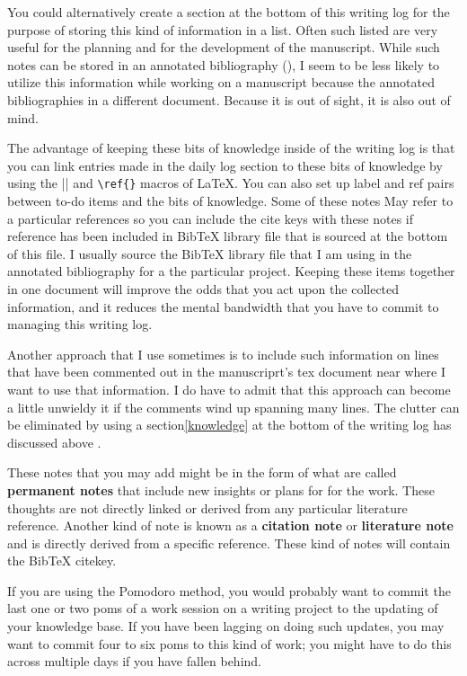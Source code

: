 \documentclass[10pt,letterpaper]{article}
\begin{document}
You could alternatively create a section at the bottom of this writing log for the purpose of storing this kind of information in a list.
Often such listed are very useful for the planning and for the development of the manuscript.
While such notes can be stored in an annotated bibliography (), I seem to be less likely to utilize this information while working on a manuscript because the annotated bibliographies in a different document.
Because it is out of sight, it is also out of mind.

The advantage of keeping these bits of knowledge inside of the writing log is that you can link entries made in the daily log section to these bits of knowledge by using the \verb||\label{}|| and \verb|\ref{}| macros of LaTeX.
You can also set up label and ref pairs between to-do items and the bits of knowledge.
Some of these notes May refer to a particular references so you can include the cite keys with these notes if reference has been included in BibTeX library file that is sourced at the bottom of this file.
I usually source the BibTeX library file that I am using in the annotated bibliography for a the particular project.
Keeping these items together in one document will improve the odds that you act upon the collected information, and it reduces the mental bandwidth that you have to commit to managing this writing log.

Another approach that I use sometimes is to include such information on lines that have been commented out in the manuscriprt's tex document near where I want to use that information.
I do have to admit that this approach can become a little unwieldy it if the comments wind up spanning many lines.
The clutter can be eliminated by using a section\ref{knowledge} at the bottom of the writing log has discussed above .

These notes that you may add might be in the form of what are called \textbf{permanent notes} that include new insights or plans for for the work.
These thoughts are not directly linked or derived from any particular literature reference.
Another kind of note is known as a \textbf{citation note} or \textbf{literature note} and is directly derived from a specific reference.
These kind of notes will contain the BibTeX citekey.

If you are using the Pomodoro method, you would probably want to commit the last one or two poms of a work session on a writing project to the updating of your knowledge base.
If you have been lagging on doing such updates, you may want to commit four to six poms to this kind of work; you might have to do this across multiple days if you have fallen behind.
\end{document}
